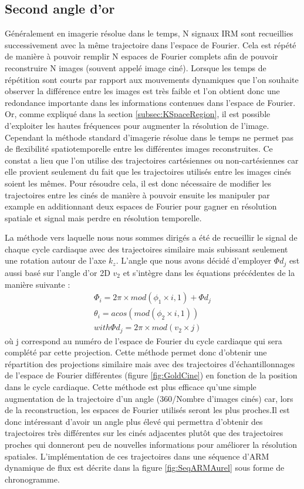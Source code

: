 \subsection{Second angle d'or}

Généralement en imagerie résolue dans le temps, N signaux IRM sont recueillies successivement avec la même trajectoire dans l'espace de Fourier. Cela est répété de manière à pouvoir remplir N espaces de Fourier complets afin de pouvoir reconstruire N images (souvent appelé image ciné). Lorsque les temps de répétition sont courts par rapport aux mouvements dynamiques que l'on souhaite observer la différence entre les images est très faible et l'on obtient donc une redondance importante dans les informations contenues dans l'espace de Fourier. Or, comme expliqué dans la section \ref{subsec:KSpaceRegion}, il est possible d'exploiter les hautes fréquences pour augmenter la résolution de l'image. Cependant la méthode standard d'imagerie résolue dans le temps ne permet pas de flexibilité spatiotemporelle entre les différentes images reconstruites. Ce constat a lieu que l'on utilise des trajectoires cartésiennes ou non-cartésiennes car elle provient seulement du fait que les trajectoires utilisés entre les images cinés soient les mêmes. Pour résoudre cela, il est donc nécessaire de modifier les trajectoires entre les cinés de manière à pouvoir ensuite les manipuler par example en additionnant deux espaces de Fourier pour gagner en résolution spatiale et signal mais perdre en résolution temporelle. 

La méthode vers laquelle nous nous sommes dirigés a été de recueillir le signal de chaque cycle cardiaque avec des trajectoires similaire mais subissant seulement une rotation autour de l'axe $k_z$. L'angle que nous avons décidé d'employer $\Phi d_j$ est aussi basé sur l'angle d'or 2D $v_2$ et s'intègre dans les équations précédentes de la manière suivante :
\begin{equation}
\begin{array}{c}
\Phi_i=2\pi \times mod(\phi_1 \times i,1) +\Phi d_j\\
\theta_i=acos(mod(\phi_2 \times i,1)) \\
with \Phi d_j=2\pi \times  mod( v_2 \times j)
\end{array}
\end{equation}
où j correspond au numéro de l'espace de Fourier du cycle cardiaque qui sera complété par cette projection. Cette méthode permet donc d'obtenir une répartition des projections similaire mais avec des trajectoires d'échantillonnages de l'espace de Fourier différentes (figure \ref{fig:GoldCine}) en fonction de la position dans le cycle cardiaque. Cette méthode est plus efficace qu'une simple augmentation de la trajectoire d'un angle (360/Nombre d'images cinés) car, lors de la reconstruction, les espaces de Fourier utilisés seront les plus proches.Il est donc intéressant d'avoir un angle plus élevé qui permettra d'obtenir des trajectoires très différentes sur les cinés adjacentes plutôt que des trajectoires proches qui donneront peu de nouvelles informations pour améliorer la résolution spatiales. 
L'implémentation de ces trajectoires dans une séquence d'ARM dynamique de flux est décrite dans la figure \ref{fig:SeqARMAurel} sous forme de chronogramme.
 
